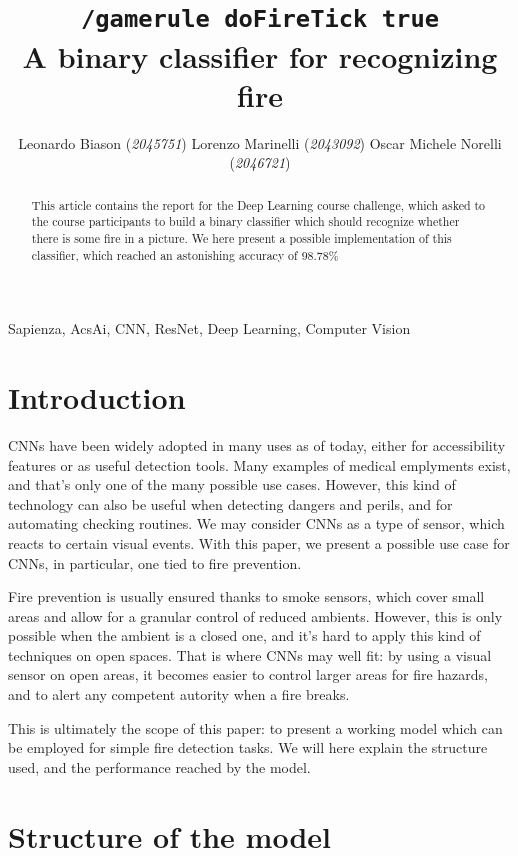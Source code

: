 \documentclass[11pt, journal]{IEEEtran}
\title{\texttt{/gamerule doFireTick true}\\A binary classifier for recognizing fire}
\author{Leonardo Biason (\textit{2045751}) \quad Lorenzo Marinelli (\textit{2043092}) \quad Oscar Michele Norelli (\textit{2046721})}
\newcommand{\nl}{

\medskip

}
\newcommand{\nl}{

\medskip

}
\begin{document}
\maketitle

\begin{abstract}
    This article contains the report for the Deep Learning course challenge, which asked to the course participants to build a binary classifier which should recognize whether there is some fire in a picture. We here present a possible implementation of this classifier, which reached an astonishing accuracy of $98.78\%$
\end{abstract}

\begin{keywords}
    Sapienza, AcsAi, CNN, ResNet, Deep Learning, Computer Vision 
\end{keywords}

\section{Introduction}

CNNs have been widely adopted in many uses as of today, either for accessibility features or as useful detection tools. Many examples of medical emplyments exist, and that's only one of the many possible use cases. However, this kind of technology can also be useful when detecting dangers and perils, and for automating checking routines. We may consider CNNs as a type of sensor, which reacts to certain visual events. With this paper, we present a possible use case for CNNs, in particular, one tied to fire prevention.
\nl
\indent Fire prevention is usually ensured thanks to smoke sensors, which cover small areas and allow for a granular control of reduced ambients. However, this is only possible when the ambient is a closed one, and it's hard to apply this kind of techniques on open spaces. That is where CNNs may well fit: by using a visual sensor on open areas, it becomes easier to control larger areas for fire hazards, and to alert any competent autority when a fire breaks.
\nl
\indent This is ultimately the scope of this paper: to present a working model which can be employed for simple fire detection tasks. We will here explain the structure used, and the performance reached by the model.

\section{Structure of the model}
\end{document}
